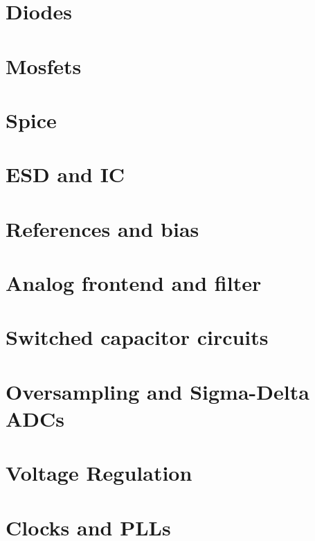 \documentclass[11pt,twoside,openright]{book}
\begin{document}
\chapter{Diodes}


\chapter{Mosfets}


\chapter{Spice}


\chapter{ESD and IC}


\chapter{References and bias}


\chapter{Analog frontend and filter}


\chapter{Switched capacitor circuits}


\chapter{Oversampling and Sigma-Delta ADCs}


\chapter{Voltage Regulation}


\chapter{Clocks and PLLs}

\end{document}
